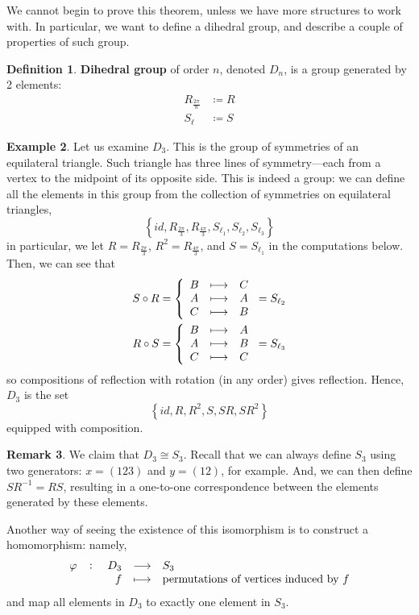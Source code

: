 \documentclass[11pt]{amsart} %
\theoremstyle{definition}
\newtheorem{definition}{Definition}[section]
\newtheorem{example}[definition]{Example}
\theoremstyle{definition}
\newtheorem{remark}[definition]{Remark}
\numberwithin{equation}{section}
\begin{document}
We cannot begin to prove this theorem, unless we have more structures to work with. In particular, we want to define a dihedral group, and describe a couple of properties of such group.

\begin{definition}
	\textbf{Dihedral group} of order $n$, denoted $D_n$, is a group generated by 2 elements:
	\begin{align*}
	R_{\frac{2\pi}{n}} &\coloneqq R\\
	S_{\ell} &\coloneqq S
	\end{align*}
\end{definition}

\begin{example}
	Let us examine $D_3$. This is the group of symmetries of an equilateral triangle. Such triangle has three lines of symmetry---each from a vertex to the midpoint of its opposite side. This is indeed a group: we can define all the elements in this group from the collection of symmetries on equilateral triangles,
	$$ \left\{ id, R_{\frac{2\pi}{3}} , R_{\frac{4\pi}{3}} , S_{\ell_1} , S_{\ell_2} , S_{\ell_3} \right\} $$
	in particular, we let $R= R_{\frac{2\pi}{3}}$, $R^2 = R_{\frac{4\pi}{3}} $, and $S = S_{\ell_1}$ in the computations below. Then, we can see that
	\begin{align*}
	S \circ R &= \left\{\begin{array}{c c c}
	B & \longmapsto & C \\
	A & \longmapsto & A \\
	C & \longmapsto & B
	\end{array} \right.= S_{\ell_2} \\
	R \circ S &= \left\{\begin{array}{c c c}
	B & \longmapsto & A \\
	A & \longmapsto & B \\
	C & \longmapsto & C
	\end{array} \right.	 = S_{\ell_3}
	\end{align*}
	so compositions of reflection with rotation (in any order) gives reflection. Hence, $D_3$ is the set
	$$ \left\{ id, R, R^2, S, SR, SR^2 \right\} $$
	equipped with composition.
\end{example}

\begin{remark}
	We claim that $D_3 \cong S_3$. Recall that we can always define $S_3$ using two generators: $x=(123)$ and $y=(12)$, for example. And, we can then define $SR^{-1} = RS$, resulting in a one-to-one correspondence between the elements generated by these elements.
	
	Another way of seeing the existence of this isomorphism is to construct a homomorphism: namely,
	$$\fullfunction{\varphi}{D_3}{S_3}{f}{\text{permutations of vertices induced by } f}$$
	and map all elements in $D_3$ to exactly one element in $S_3$.
\end{remark}
\end{document}
